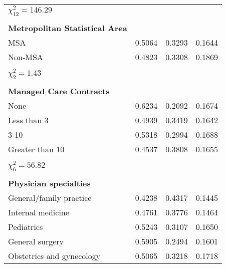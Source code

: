 \documentclass[11pt, oneside]{article}        %
\begin{document}
{\begin{center}
\begin{longtable}{lccc}
$\chi^2_{12} = 146.29$                 &          &            &            \\
                                       &          &            &            \\
\textbf{Metropolitan Statistical Area} &          &            &            \\
MSA                                    & 0.5064   & 0.3293     & 0.1644     \\
Non-MSA                                & 0.4823   & 0.3308     & 0.1869     \\
                                       &          &            &            \\
$\chi^2_2 = 1.43$                      &          &            &            \\
                                       &          &            &            \\
\textbf{Managed Care Contracts}        &          &            &            \\
None                                   & 0.6234   & 0.2092     & 0.1674     \\
Less than 3                            & 0.4939   & 0.3419     & 0.1642     \\
3-10                                   & 0.5318   & 0.2994     & 0.1688     \\
Greater than 10                        & 0.4537   & 0.3808     & 0.1655     \\
                                       &          &            &            \\
$\chi^2_6 = 56.82$                     &          &            &            \\
                                       &          &            &            \\
\textbf{Physician specialties}         &          &            &            \\
General/family practice                & 0.4238   & 0.4317     & 0.1445     \\
Internal medicine                      & 0.4761   & 0.3776     & 0.1464     \\
Pediatrics                             & 0.5243   & 0.3107     & 0.1650     \\
General surgery                        & 0.5905   & 0.2494     & 0.1601     \\
Obstetrics and gynecology              & 0.5065   & 0.3218     & 0.1718     \\

\end{longtable}
\end{center}}
\end{document}
